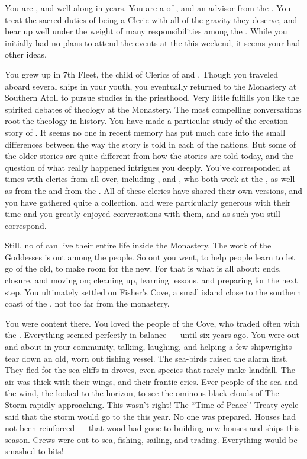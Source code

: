 \documentclass[char]{GL2020}
\begin{document}
\name{\cEbbPriest{}}

You are \cEbbPriest{\intro}, and well along in years. You are a \cEbbPriest{\cleric} of \cEbbFull{\full}, and an advisor from the \pShip{}. You treat the sacred duties of being a Cleric with all of the gravity they deserve, and bear up well under the weight of many responsibilities among the \pShippies{}. While you initially had no plans to attend the events at the \pSchool{} this weekend, it seems your \cEbb{\Deity} had other ideas.

You grew up in 7th Fleet, the child of Clerics of \cEbb{} and \cFlow{}. Though you traveled aboard several ships in your youth, you eventually returned to the Monastery at Southern Atoll to pursue studies in the priesthood. Very little fulfills you like the spirited debates of theology at the Monastery. The most compelling conversations root the theology in history. You have made a particular study of the creation story of \pEarth{}. It seems no one in recent memory has put much care into the small differences between the way the story is told in each of the nations. But some of the older stories are quite different from how the stories are told today, and the question of what really happened intrigues you deeply. You've corresponded at times with clerics from all over, including \cBeetle{\full}, and \cFlowPriest{\full}, who both work at the \pSchool{}, as well as \cAntiChup{\full} from the \pTech{} and \cHedonist{\full} from the \pFarm{}. All of these clerics have shared their own versions, and you have gathered quite a collection. \cBeetle{} and \cFlowPriest{} were particularly generous with their time and you greatly enjoyed conversations with them, and as such you still correspond. 

Still, no \cEbbPriest{\cleric} of \cEbb{} can live their entire life inside the Monastery. The work of the Goddesses is out among the people. So out you went, to help people learn to let go of the old, to make room for the new. For that is what \cEbb{} is all about: ends, closure, and moving on; cleaning up, learning lessons, and preparing for the next step. You ultimately settled on Fisher’s Cove, a small island close to the southern coast of the \pFarm{}, not too far from the monastery.

You were content there. You loved the people of the Cove, who traded often with the \pFarmers{}. Everything seemed perfectly in balance — until six years ago. You were out and about in your community, talking, laughing, and helping a few shipwrights tear down an old, worn out fishing vessel. The sea-birds raised the alarm first. They fled for the sea cliffs in droves, even species that rarely make landfall. The air was thick with their wings, and their frantic cries. Ever people of the sea and the wind, the \pShip{} looked to the horizon, to see the ominous black clouds of The Storm rapidly approaching. This wasn’t right! The ``Time of Peace’’ Treaty cycle said that the storm would go to the \pTech{} this year. No one was prepared. Houses had not been reinforced — that wood had gone to building new houses and ships this season. Crews were out to sea, fishing, sailing, and trading. Everything would be smashed to bits!
\end{document}
